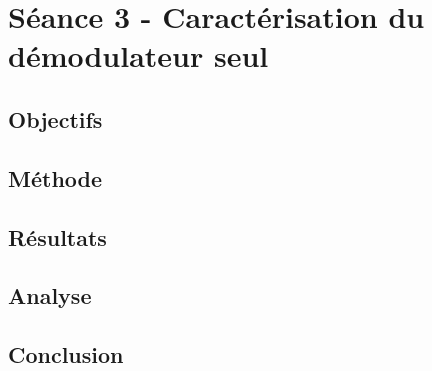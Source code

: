 

\section{Séance 3 - Caractérisation du démodulateur seul}

\subsection{Objectifs}

\subsection{Méthode}

\subsection{Résultats}

\subsection{Analyse}

\subsection{Conclusion}